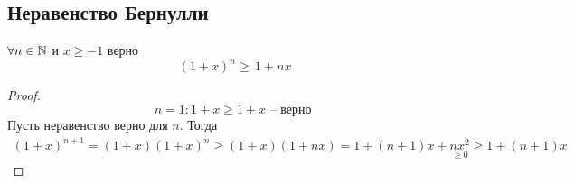 \subsection{Неравенство Бернулли}
\begin{lemma}
    $ \forall n \in \mathbb{N} $ и $ x \geq  -1 $ верно \begin{equation}
        (1 + x)^ n \geq\, 1 + nx
    \end{equation}
\end{lemma} \begin{proof}
    \begin{equation}
    n = 1: 1 + x \geq 1 + x \text{ -- верно }
   \end{equation}
   Пусть неравенство верно для $ n $. Тогда \begin{multline}
    (1 + x)^{n + 1} = (1 + x)(1 + x)^ n \geq (1 + x)(1 + nx) = 1 + (n + 1)x + \underset{ \geq 0}{nx^2} \geq 1 + (n + 1)x
   \end{multline}
\end{proof}
